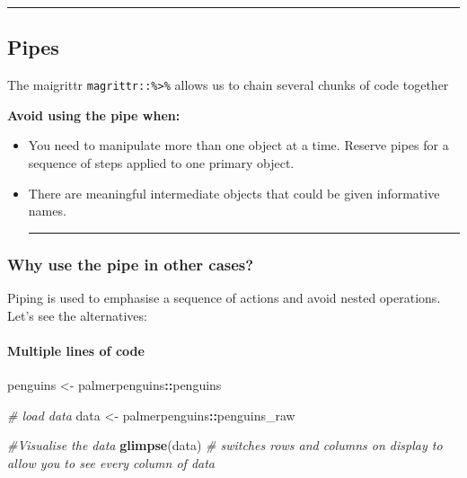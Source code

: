 \documentclass[
]{article}
\newenvironment{Shaded}{\begin{snugshade}}{\end{snugshade}}
\newcommand{\CommentTok}[1]{\textcolor[rgb]{0.56,0.35,0.01}{\textit{#1}}}
\newcommand{\FunctionTok}[1]{\textcolor[rgb]{0.13,0.29,0.53}{\textbf{#1}}}
\newcommand{\NormalTok}[1]{#1}
\newcommand{\OtherTok}[1]{\textcolor[rgb]{0.56,0.35,0.01}{#1}}
\newcommand{\SpecialCharTok}[1]{\textcolor[rgb]{0.81,0.36,0.00}{\textbf{#1}}}
\begin{document}
\begin{center}\rule{0.5\linewidth}{0.5pt}\end{center}

\hypertarget{pipes}{%
\subsection{Pipes}\label{pipes}}

The maigrittr \texttt{magrittr::\%\textgreater{}\%} allows us to chain
several chunks of code together

\textbf{Avoid using the pipe when:}

\begin{itemize}
\item
  You need to manipulate more than one object at a time. Reserve pipes
  for a sequence of steps applied to one primary object.
\item
  There are meaningful intermediate objects that could be given
  informative names.

  \begin{center}\rule{0.5\linewidth}{0.5pt}\end{center}
\end{itemize}

\hypertarget{why-use-the-pipe-in-other-cases}{%
\subsubsection{Why use the pipe in other
cases?}\label{why-use-the-pipe-in-other-cases}}

Piping is used to emphasise a sequence of actions and avoid nested
operations. Let's see the alternatives:

\hypertarget{multiple-lines-of-code}{%
\paragraph{Multiple lines of code}\label{multiple-lines-of-code}}

\begin{Shaded}
\begin{Highlighting}[]
\NormalTok{penguins }\OtherTok{\textless{}{-}}\NormalTok{ palmerpenguins}\SpecialCharTok{::}\NormalTok{penguins }

\CommentTok{\# load data}
\NormalTok{data }\OtherTok{\textless{}{-}}\NormalTok{ palmerpenguins}\SpecialCharTok{::}\NormalTok{penguins\_raw }

\CommentTok{\#Visualise the data}
\FunctionTok{glimpse}\NormalTok{(data) }\CommentTok{\# switches rows and columns on display to allow you to see every column of data}
\end{Highlighting}
\end{Shaded}
\end{document}

